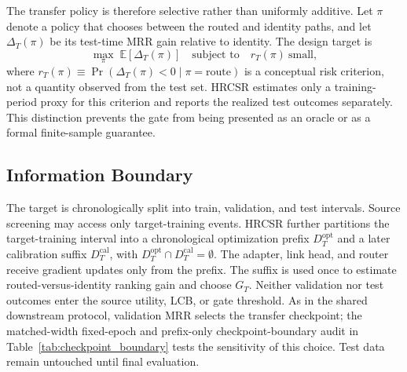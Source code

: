 \documentclass[journal]{IEEEtran}
\begin{document}
The transfer policy is therefore selective rather than uniformly additive. Let $\pi$ denote a policy that chooses between the routed and identity paths, and let $\Delta_T(\pi)$ be its test-time MRR gain relative to identity. The design target is
\begin{equation}
\max_{\pi}\;\mathbb{E}[\Delta_T(\pi)]\quad\text{subject to}\quad
r_T(\pi)\ \text{small},
\label{eq:selective_transfer_goal}
\end{equation}
where $r_T(\pi)\equiv\Pr\!\left(\Delta_T(\pi)<0\mid \pi=\mathrm{route}\right)$ is a conceptual risk criterion, not a quantity observed from the test set. HRCSR estimates only a training-period proxy for this criterion and reports the realized test outcomes separately. This distinction prevents the gate from being presented as an oracle or as a formal finite-sample guarantee.

\subsection{Information Boundary}
The target is chronologically split into train, validation, and test intervals. Source screening may access only target-training events. HRCSR further partitions the target-training interval into a chronological optimization prefix $D_T^{\mathrm{opt}}$ and a later calibration suffix $D_T^{\mathrm{cal}}$, with $D_T^{\mathrm{opt}}\cap D_T^{\mathrm{cal}}=\emptyset$. The adapter, link head, and router receive gradient updates only from the prefix. The suffix is used once to estimate routed-versus-identity ranking gain and choose $G_T$. Neither validation nor test outcomes enter the source utility, LCB, or gate threshold. As in the shared downstream protocol, validation MRR selects the transfer checkpoint; the matched-width fixed-epoch and prefix-only checkpoint-boundary audit in Table~\ref{tab:checkpoint_boundary} tests the sensitivity of this choice. Test data remain untouched until final evaluation.
\end{document}
